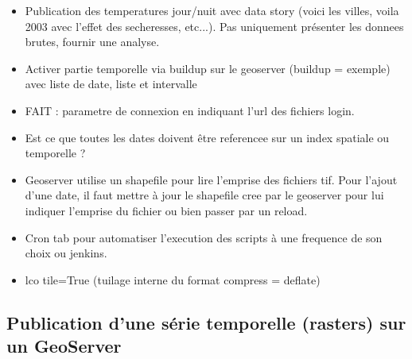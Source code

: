 \documentclass[10pt,a4paper]{article}
\begin{document}
\begin{itemize}
\item Publication des temperatures jour/nuit avec data story (voici les villes, voila 2003 avec l'effet des secheresses, etc...). Pas uniquement présenter les donnees brutes, fournir une analyse.
\item Activer partie temporelle via buildup sur le geoserver (buildup = exemple) avec liste de date, liste et intervalle
\item FAIT : parametre de connexion en indiquant l'url des fichiers login.
\item Est ce que toutes les dates doivent être referencee sur un index spatiale ou temporelle ?
\item Geoserver utilise un shapefile pour lire l'emprise des fichiers tif. Pour l'ajout d'une date, il faut mettre à jour le shapefile cree par le geoserver pour lui indiquer l'emprise du fichier ou bien passer par un reload.
\item Cron tab pour automatiser l'execution des scripts à une frequence de son choix ou jenkins.
\item             lco tile=True (tuilage interne du format
            compress = deflate)
\end{itemize}

\subsection{Publication d'une série temporelle (rasters) sur un GeoServer}
\end{document}
